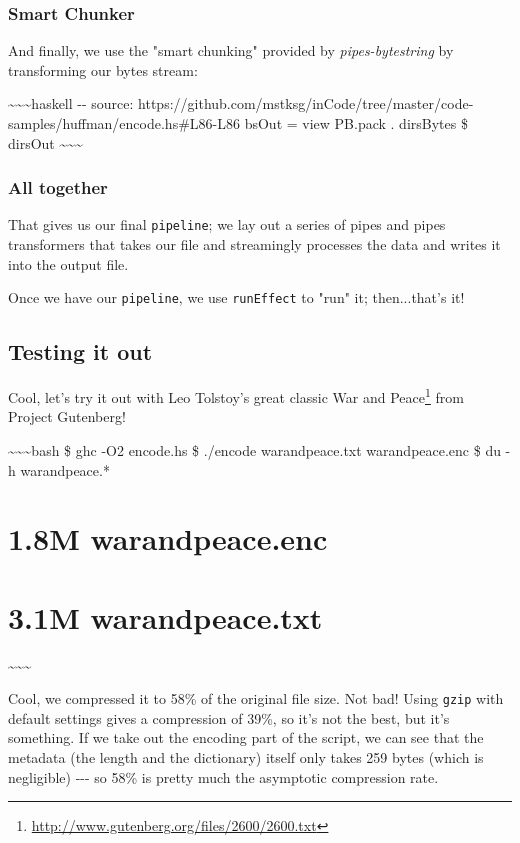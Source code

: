 \documentclass[]{article}
\renewcommand{\href}[2]{#2\footnote{\url{#1}}}
\begin{document}
\subsubsection{Smart Chunker}

And finally, we use the "smart chunking" provided by \emph{pipes-bytestring} by
transforming our bytes stream:

\textasciitilde{}\textasciitilde{}\textasciitilde{}haskell -\/- source:
https://github.com/mstksg/inCode/tree/master/code-samples/huffman/encode.hs\#L86-L86
bsOut = view PB.pack . dirsBytes \$ dirsOut
\textasciitilde{}\textasciitilde{}\textasciitilde{}

\subsubsection{All together}

That gives us our final \texttt{pipeline}; we lay out a series of pipes and
pipes transformers that takes our file and streamingly processes the data and
writes it into the output file.

Once we have our \texttt{pipeline}, we use \texttt{runEffect} to "run" it;
then...that's it!

\subsection{Testing it out}

Cool, let's try it out with Leo Tolstoy's great classic
\href{http://www.gutenberg.org/files/2600/2600.txt}{War and Peace} from Project
Gutenberg!

\textasciitilde{}\textasciitilde{}\textasciitilde{}bash \$ ghc -O2 encode.hs \$
./encode warandpeace.txt warandpeace.enc \$ du -h warandpeace.*

\section{1.8M warandpeace.enc}

\section{3.1M warandpeace.txt}

\textasciitilde{}\textasciitilde{}\textasciitilde{}

Cool, we compressed it to 58\% of the original file size. Not bad! Using
\texttt{gzip} with default settings gives a compression of 39\%, so it's not the
best, but it's something. If we take out the encoding part of the script, we can
see that the metadata (the length and the dictionary) itself only takes 259
bytes (which is negligible) -\/-\/- so 58\% is pretty much the asymptotic
compression rate.
\end{document}
